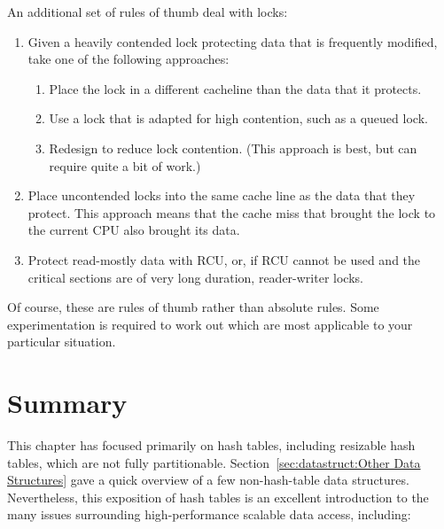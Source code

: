 An additional set of rules of thumb deal with locks:

\begin{enumerate}
\item	Given a heavily contended lock protecting data that is
	frequently modified, take one of the following approaches:
	\begin{enumerate}
	\item	Place the lock in a different cacheline than the data
		that it protects.
	\item	Use a lock that is adapted for high contention, such
		as a queued lock.
	\item	Redesign to reduce lock contention.
		(This approach is best, but can require quite a bit
		of work.)
	\end{enumerate}
\item	Place uncontended locks into the same cache line as the data
	that they protect.
	This approach means that the cache miss that brought the
	lock to the current CPU also brought its data.
\item	Protect read-mostly data with RCU, or, if RCU cannot be used and
	the critical sections are of very long duration, reader-writer locks.
\end{enumerate}

Of course, these are rules of thumb rather than absolute rules.
Some experimentation is required to work out which are most applicable
to your particular situation.

\section{Summary}
\label{sec:datastruct:Summary}

This chapter has focused primarily on hash tables, including resizable
hash tables, which are not fully partitionable.
Section~\ref{sec:datastruct:Other Data Structures} gave a quick
overview of a few non-hash-table data structures.
Nevertheless, this exposition of hash tables is an excellent introduction
to the many issues surrounding high-performance scalable data access,
including:

